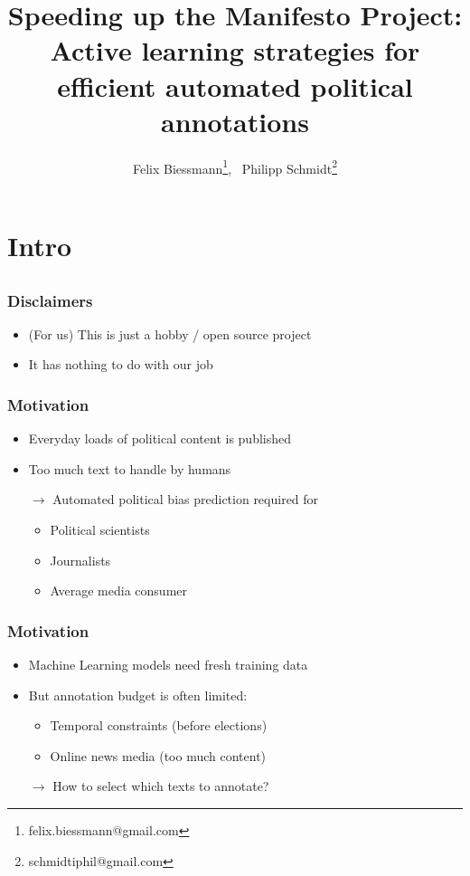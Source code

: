 \documentclass[]{beamer}
\institute[]{}
\title[Active Manifesto]{
{
Speeding up the Manifesto Project: \\ Active learning strategies for \\efficient automated political annotations
}}
\author{
Felix Biessmann\thanks{felix.biessmann@gmail.com},~ 
Philipp Schmidt\thanks{schmidtiphil@gmail.com}
}
\begin{document}
\begin{frame} 
\titlepage 
\end{frame}	

%
\section{Intro}
\subsection{}

\begin{frame}\frametitle{Disclaimers}
\small
\begin{itemize}[<+->]
\item (For us) This is just a hobby / open source project
\item It has nothing to do with our job
\end{itemize}
\end{frame}

\begin{frame}\frametitle{Motivation}
\begin{itemize}[<+->]
\item Everyday loads of political content is published
\item Too much text to handle by humans
\item[$\rightarrow$] Automated political bias prediction required for 
\begin{itemize}
\item Political scientists
\item Journalists
\item Average media consumer
\end{itemize}
\cite{Biessmann16, Merz2016}
\end{itemize}
\end{frame}

\begin{frame}\frametitle{Motivation}
\begin{itemize}[<+->]
\item Machine Learning models need fresh training data
\item But annotation budget is often limited:
\begin{itemize}
\item Temporal constraints (before elections) \cite{merz2017}
\item Online news media (too much content) 
\end{itemize}
\item[$\rightarrow$] How to select which texts to annotate?
\end{itemize}
\end{frame}
\end{document}
